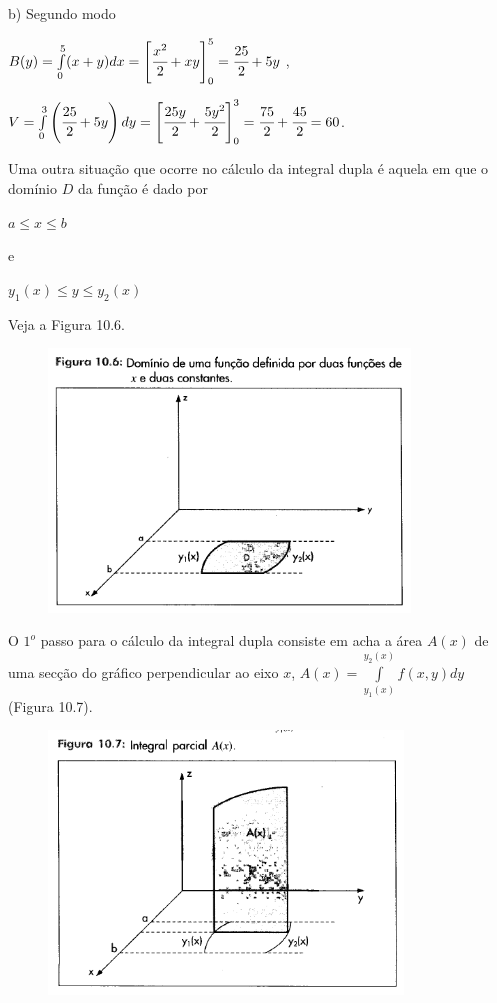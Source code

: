 			b) Segundo modo

			\medskip

			$B(y) = \int \limits^{5}_{0} (x + y)dx = \left[ \cfrac{x^{2}}{2} + xy \right]^{5}_{0} = \cfrac{25}{2} + 5y$ ,

			$V = \int \limits^{3}_{0} \left( \cfrac{25}{2} + 5y \right) dy = \left[ \cfrac{25y}{2} + \cfrac{5y^{2}}{2} \right]^{3}_{0} = \cfrac{75}{2} + \cfrac{45}{2} = 60$.

			\bigskip

			Uma outra situação que ocorre no cálculo da integral dupla é aquela em que o domínio $D$ da função é dado por

			\medskip

			$a \leq x \leq b$

			\smallskip

			e

			\smallskip

			$y_{1}(x) \leq y \leq y_{2}(x)$

			\medskip

			Veja a Figura 10.6.

			\begin{figure}[H]
				\includegraphics[height=7cm]{images/morettin_figura-10-6}
			\end{figure}

			O $1^{o}$ passo para o cálculo da integral dupla consiste em acha a área $A(x)$ de uma secção do gráfico perpendicular ao eixo $x$, $A(x) = \int \limits^{y_{2}(x)}_{y_{1}(x)} f(x, y)dy$ (Figura 10.7).

			\begin{figure}[H]
				\includegraphics[height=7cm]{images/morettin_figura-10-7}
			\end{figure}

